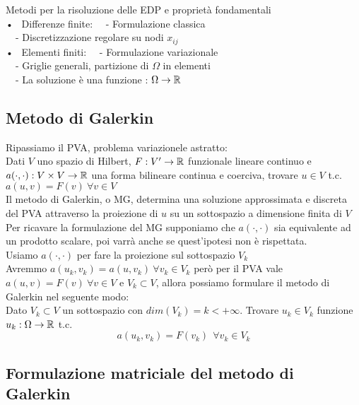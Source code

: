 \documentclass{article}
\newcommand{\om}{\Omega}
\begin{document}
Metodi per la risoluzione delle EDP e proprietà fondamentali\\

• \ Differenze finite:
\phantom{} \ \ - Formulazione classica\\
\phantom{} \ \ - Discretizzazione regolare su nodi $x_{ij}$\\

• \ Elementi finiti:
\phantom{} \ \ - Formulazione variazionale\\
\phantom{} \ \ - Griglie generali, partizione di $\om$ in elementi\\
\phantom{} \ \ - La soluzione è una funzione : $\om\to \R$\\




\subsection{Metodo di Galerkin}

Ripassiamo il PVA, problema variazionele astratto:\\
Dati $V$ uno spazio di Hilbert,  $F:V'\to \mathbb R$ funzionale lineare continuo e $a(\cdot,\cdot) : V\times V \to \mathbb R$  una forma bilineare continua e coerciva, trovare $u\in V$ t.c. $a(u,v)=F(v) \ \forall v\in V$\\

Il metodo di Galerkin, o MG, determina una soluzione approssimata e discreta del PVA attraverso la proiezione di $u$ su un sottospazio a dimensione finita di $V$\\

Per ricavare la formulazione del MG supponiamo che $a(\cdot,\cdot)$ sia equivalente ad un prodotto scalare, poi varrà anche se quest'ipotesi non è rispettata.\\
Usiamo $a(\cdot,\cdot)$ per fare la proiezione sul sottospazio $V_k$\\
Avremmo $a(u_k,v_k)=a(u,v_k) \ \forall v_k\in V_k$ però per il PVA vale $a(u,v)=F(v) \ \forall v\in V$  e $V_k\subset V$, allora possiamo formulare il metodo di Galerkin nel seguente modo:\\

Dato $V_k\subset V$ un sottospazio con $dim(V_k)=k< +\infty$. Trovare $u_k\in V_k$ funzione $u_k:\om\to\R$ t.c.
\[
a(u_k,v_k)=F(v_k) \ \ \forall v_k\in V_k
\]


\subsection{Formulazione matriciale del metodo di Galerkin}
\end{document}
